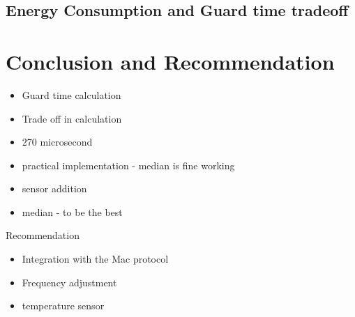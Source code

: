 \documentclass[a4paper,8pt]{report}
\begin{document}
\section{Energy Consumption and Guard time tradeoff}
\newpage
\chapter{Conclusion and Recommendation}
\begin{itemize}
\item Guard time calculation
\item Trade off in calculation
\item 270 microsecond
\item practical implementation - median is fine working
\item sensor addition
\item median - to be the best
\end{itemize}
Recommendation
\begin{itemize}
\item Integration with the Mac protocol
\item Frequency adjustment
\item temperature sensor
\end{itemize}
\end{document}

